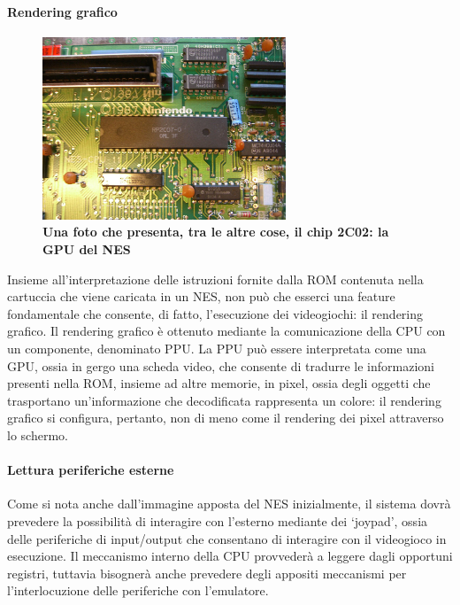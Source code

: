 \documentclass[11pt]{article}
\begin{document}
\paragraph{Rendering grafico}
\begin{figure}[h]
\centering
\includegraphics[width=275px, height=206px]{2C02}\\
\small\textbf{Una foto che presenta, tra le altre cose, il chip 2C02: la GPU del NES}
\end{figure}
Insieme all'interpretazione delle istruzioni fornite dalla ROM contenuta nella cartuccia che viene caricata in un NES, non può che esserci una feature fondamentale che consente, di fatto, l'esecuzione dei videogiochi: il rendering grafico. Il rendering grafico è ottenuto mediante la comunicazione della CPU con un componente, denominato PPU. La PPU può essere interpretata come una GPU, ossia in gergo una scheda video, che consente di tradurre le informazioni presenti nella ROM, insieme ad altre memorie, in pixel, ossia degli oggetti che trasportano un'informazione che decodificata rappresenta un colore: il rendering grafico si configura, pertanto, non di meno come il rendering dei pixel attraverso lo schermo.
\paragraph{Lettura periferiche esterne}
Come si nota anche dall'immagine apposta del NES inizialmente, il sistema dovrà prevedere la possibilità di interagire con l'esterno mediante dei `joypad', ossia delle periferiche di input/output che consentano di interagire con il videogioco in esecuzione. Il meccanismo interno della CPU provvederà a leggere dagli opportuni registri, tuttavia bisognerà anche prevedere degli appositi meccanismi per l'interlocuzione delle periferiche con l'emulatore.
\clearpage
\end{document}
